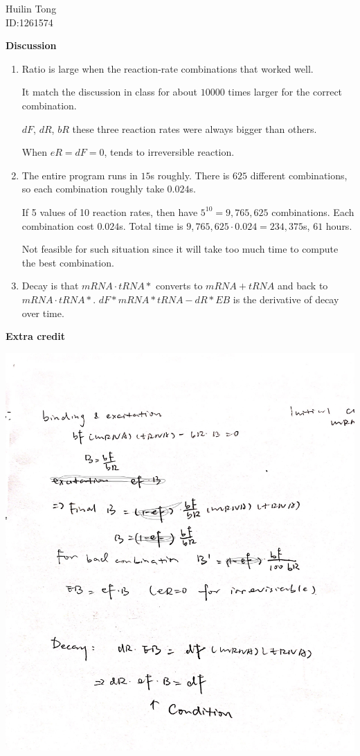 \documentclass{article}
\begin{document}
\begin{center} Huilin Tong\\
ID:1261574
\end{center}

{\bf Discussion}\\
\begin{enumerate}
\item Ratio is large when the reaction-rate combinations that worked well.

It match the discussion in class for about $10000$ times larger for the correct combination.

$dF$, $dR$, $bR$ these three reaction rates were always bigger than others.

When $eR=dF=0$, tends to irreversible reaction.

\item The entire program runs in $15$s roughly. There is $625$ different combinations, so each combination roughly take $0.024$s.

If 5 values of 10 reaction rates, then have $5^{10}=9,765,625$ combinations. Each combination cost $0.024$s. Total time is $9,765,625 \cdot 0.024 = 234,375$s, $61$ hours.

Not feasible for such situation since it will take too much time to compute the best combination.

\item Decay is that $mRNA\cdot tRNA*$ converts to $mRNA+tRNA$ and back to $mRNA\cdot tRNA*$. $dF*mRNA*tRNA - dR*EB$ is the derivative of decay over time.
\end{enumerate}

{\bf Extra credit}\\


\begin{center}
\includegraphics[scale=0.15]{extra.png}	
\end{center}
\end{document}
